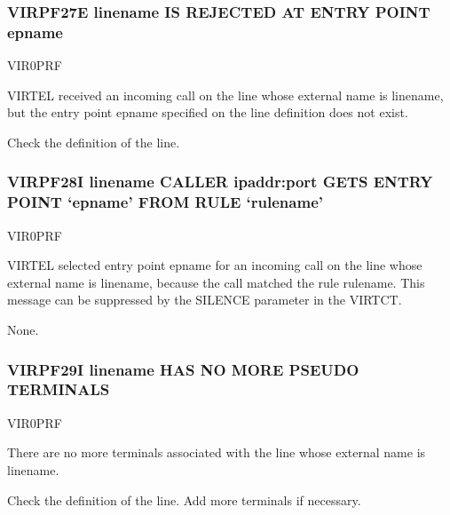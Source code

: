 \documentclass[letterpaper,10pt,english]{sphinxmanual}
\begin{document}
\subsubsection{VIRPF27E linename IS REJECTED AT ENTRY POINT epname}
\label{\detokenize{messages:virpf27e-linename-is-rejected-at-entry-point-epname}}\begin{description}
\sphinxAtStartPar
VIR0PRF

\sphinxAtStartPar
VIRTEL received an incoming call on the line whose external name is linename, but the entry point epname specified on the line definition does not exist.

\sphinxAtStartPar
Check the definition of the line.

\end{description}


\subsubsection{VIRPF28I linename CALLER ipaddr:port GETS ENTRY POINT ‘epname’ FROM RULE ‘rulename’}
\label{\detokenize{messages:virpf28i-linename-caller-ipaddr-port-gets-entry-point-epname-from-rule-rulename}}\begin{description}
\sphinxAtStartPar
VIR0PRF

\sphinxAtStartPar
VIRTEL selected entry point epname for an incoming call on the line whose external name is linename, because the call matched the rule rulename. This message can be suppressed by the SILENCE parameter in the VIRTCT.

\sphinxAtStartPar
None.

\end{description}


\subsubsection{VIRPF29I linename HAS NO MORE PSEUDO TERMINALS}
\label{\detokenize{messages:virpf29i-linename-has-no-more-pseudo-terminals}}\begin{description}
\sphinxAtStartPar
VIR0PRF

\sphinxAtStartPar
There are no more terminals associated with the line whose external name is linename.

\sphinxAtStartPar
Check the definition of the line. Add more terminals if necessary.

\end{description}
\end{document}
